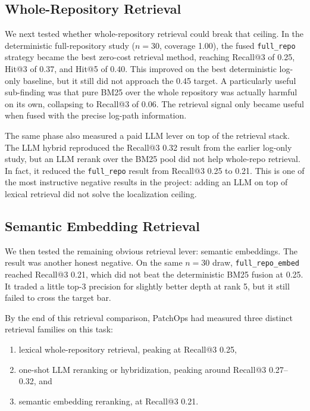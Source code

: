 \subsection{Whole-Repository Retrieval}

We next tested whether whole-repository retrieval could break that ceiling. In the
deterministic full-repository study (\(n=30\), coverage 1.00), the fused \texttt{full\_repo} strategy became the
best zero-cost retrieval method, reaching Recall@3 of 0.25, Hit@3 of 0.37, and Hit@5 of 0.40. This improved on
the best deterministic log-only baseline, but it still did not approach the 0.45 target. A particularly useful
sub-finding was that pure BM25 over the whole repository was actually harmful on its own, collapsing to
Recall@3 of 0.06. The retrieval signal only became useful when fused with the precise log-path information.

The same phase also measured a paid LLM lever on top of the retrieval stack. The LLM hybrid reproduced the
Recall@3 0.32 result from the earlier log-only study, but an LLM rerank over the BM25 pool did not help whole-repo retrieval. In
fact, it reduced the \texttt{full\_repo} result from Recall@3 0.25 to 0.21. This is one of the most instructive
negative results in the project: adding an LLM on top of lexical retrieval did not solve the localization
ceiling.

\subsection{Semantic Embedding Retrieval}

We then tested the remaining obvious retrieval lever: semantic embeddings. The result was another honest
negative. On the same \(n=30\) draw, \texttt{full\_repo\_embed} reached Recall@3 0.21, which did not beat the
deterministic BM25 fusion at 0.25. It traded a little top-3 precision for slightly better depth at rank 5, but
it still failed to cross the target bar.

By the end of this retrieval comparison, PatchOps had measured three distinct retrieval families on this task:

\begin{enumerate}
\item lexical whole-repository retrieval, peaking at Recall@3 0.25,
\item one-shot LLM reranking or hybridization, peaking around Recall@3 0.27--0.32, and
\item semantic embedding reranking, at Recall@3 0.21.
\end{enumerate}

